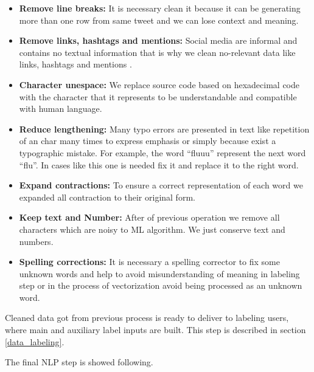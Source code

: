 \documentclass[12pt]{report}
\begin{document}
\begin{itemize}[nolistsep]
	\item \textbf{Remove line breaks:} It is necessary clean it because it can be generating more than one row from same tweet and we can lose context and meaning.
	
	\item \textbf{Remove links, hashtags and mentions:} Social media are informal and contains no textual information that is why we clean no-relevant data like links, hashtags and mentions \cite{Dai2017}.
	
	\item \textbf{Character unespace:} We replace source code based on hexadecimal code with the character that it represents to be understandable and compatible with human language.
	
	\item \textbf{Reduce lengthening:} Many typo errors are presented in text like repetition of an char many times to express emphasis or simply because exist a typographic mistake. For example, the word ``fluuu'' represent the next word ``flu''. In cases like this one is needed fix it and replace it to the right word.
	
	\item \textbf{Expand contractions:} To ensure a correct representation of each word we expanded all contraction to their original form.
	
	\item \textbf{Keep text and Number:} After of previous operation we remove all characters which are noisy to \ac{ML} algorithm. We just conserve text and numbers.
	
	\item \textbf{Spelling corrections:} It is necessary a spelling corrector to fix some unknown words and help to avoid misunderstanding of meaning in labeling step or in the process of vectorization avoid being processed as an unknown word.\\
	
\end{itemize}

Cleaned data got from previous process is ready to deliver to labeling users, where main and auxiliary label inputs are built. This step is described in section \ref{data_labeling}.

The final \ac{NLP} step is showed following.
\end{document}
